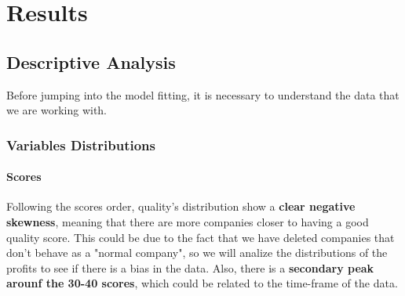 \documentclass[11pt,english,a4paper,hidelinks]{book}
\begin{document}
\chapter{Results}
\section{Descriptive Analysis}

Before jumping into the model fitting, it is necessary to understand the data that we are working with.

\subsection{Variables Distributions}

\subsubsection{Scores}
Following the scores order, quality's distribution show a \textbf{clear negative skewness}, meaning that there are more companies closer to having a good quality score. This could be due to the fact that we have deleted companies that don't behave as a "normal company", so we will analize the distributions of the profits to see if there is a bias in the data. Also, there is a \textbf{secondary peak arounf the 30-40 scores}, which could be related to the time-frame of the data.
\end{document}
